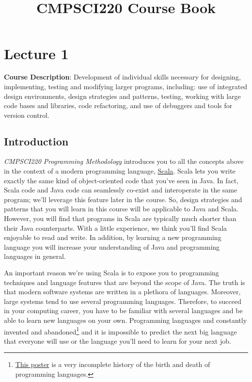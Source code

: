 \documentclass{book}
\title{CMPSCI220 Course Book}
\begin{document}
\maketitle
\tableofcontents

\chapter{Lecture 1}

\textbf{Course Description}: Development of individual skills necessary for
designing, implementing, testing and modifying larger programs, including: use
of integrated design environments, design strategies and patterns, testing,
working with large code bases and libraries, code refactoring, and use of
debuggers and tools for version control.

\section{Introduction}

\emph{CMPSCI220 Programming Methodology} introduces you to all the concepts
above in the context of a modern programming language,
\href{http://www.scala-lang.org/what-is-scala.html}{Scala}.
Scala lets you write exactly the same kind
of object-oriented code that you've seen in Java. In fact, Scala code and Java
code can seamlessly co-exist and interoperate in the same program; we'll
leverage this feature later in the course. So, design strategies and patterns
that you will learn in this course will be applicable to Java and Scala.
However, you will find that programs in Scala are typically much shorter than
their Java counterparts. With a little experience, we think you'll find Scala
enjoyable to read and write. In addition, by learning a new programming language
you will increase your understanding of Java and programming languages in
general.

An important reason we're using Scala is to expose you to programming techniques
and language features that are beyond the scope of Java. The truth is that
modern software systems are written in a plethora of languages. Moreover, large
systems tend to use several programming languages. Therefore, to succeed in your
computing career, you have to be familiar with several languages and be able to
learn new languages on your own. Programming
languages and constantly invented and abandoned\footnote{\href{http://www.oreillynet.com/pub/a/oreilly/news/languageposter_0504.html}{This poster} is a very incomplete history of the birth and death of programming languages.}
 and it is impossible to predict the next big language that everyone
will use or the language you'll need to learn for your next job.
\end{document}
